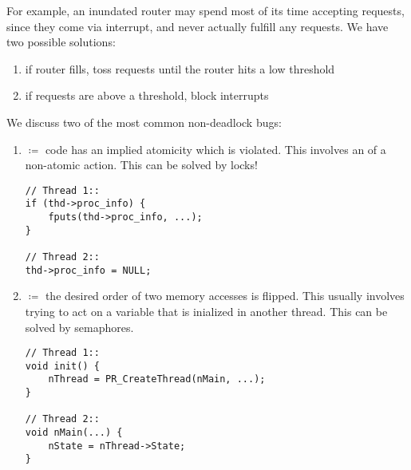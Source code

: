 \documentclass[../../lecture_notes.tex]{subfiles}
\begin{document}
\begin{minipage}{0.7\linewidth}
For example, an inundated router may spend most of its time accepting requests, since they come via interrupt, and never actually fulfill any requests. We have two possible solutions:
\begin{enumerate}[nosep]
\item if router fills, toss requests until the router hits a low threshold
\item if requests are above a threshold, block interrupts 
\end{enumerate}
\end{minipage}%
\begin{minipage}{0.3\linewidth}
\centering
{}
\end{minipage}

We discuss two of the most common non-deadlock bugs:
\begin{enumerate}
\item {} $\coloneqq$ code has an implied atomicity which is violated. This involves an  of a non-atomic action. This can be solved by locks!
\begin{lstlisting}
// Thread 1::
if (thd->proc_info) {
	fputs(thd->proc_info, ...);
}

// Thread 2::
thd->proc_info = NULL;
\end{lstlisting}

\item {} $\coloneqq$ the desired order of two memory accesses is flipped. This usually involves trying to act on a variable that is inialized in another thread. This can be solved by semaphores.
\begin{lstlisting}
// Thread 1::
void init() {
	nThread = PR_CreateThread(nMain, ...);
}

// Thread 2::
void nMain(...) {
	nState = nThread->State;
}
\end{lstlisting}
\end{enumerate}
\end{document}
